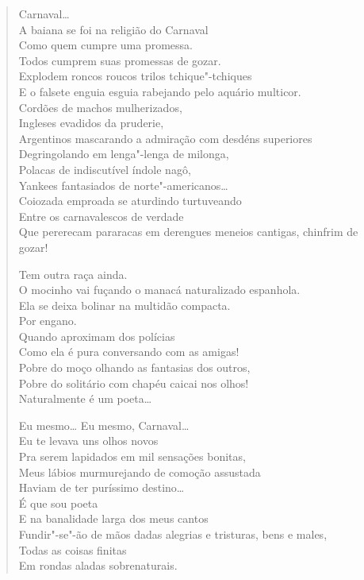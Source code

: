 \begin{verse}
Carnaval\ldots{}\\
A baiana se foi na religião do Carnaval\\
Como quem cumpre uma promessa.\\
Todos cumprem suas promessas de gozar.\\
Explodem roncos roucos trilos tchique"-tchiques\\
E o falsete enguia esguia rabejando pelo aquário multicor.\\
Cordões de machos mulherizados,\\
Ingleses evadidos da pruderie,\\
Argentinos mascarando a admiração com desdéns superiores\\
Degringolando em lenga"-lenga de milonga,\\
Polacas de indiscutível índole nagô,\\
Yankees fantasiados de norte"-americanos\ldots{}\\
Coiozada emproada se aturdindo turtuveando\\
Entre os carnavalescos de verdade\\
Que pererecam pararacas em derengues meneios cantigas, chinfrim de gozar!

Tem outra raça ainda.\\
O mocinho vai fuçando o manacá naturalizado espanhola.\\
Ela se deixa bolinar na multidão compacta.\\
\quad\quad\quad\quad\quad\quad{}Por engano.\\
Quando aproximam dos polícias\\
Como ela é pura conversando com as amigas!\\
Pobre do moço olhando as fantasias dos outros,\\
Pobre do solitário com chapéu caicai nos olhos!\\
Naturalmente é um poeta\ldots{}

Eu mesmo\ldots{} Eu mesmo, Carnaval\ldots{}\\
Eu te levava uns olhos novos\\
Pra serem lapidados em mil sensações bonitas,\\
Meus lábios murmurejando de comoção assustada\\
Haviam de ter puríssimo destino\ldots{}\\
É que sou poeta\\
E na banalidade larga dos meus cantos\\
Fundir"-se"-ão de mãos dadas alegrias e tristuras, bens e males,\\
Todas as coisas finitas\\
Em rondas aladas sobrenaturais.


\end{verse}
